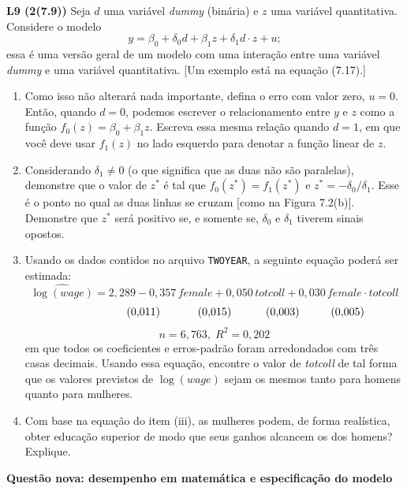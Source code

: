 \documentclass[12pt,letterpaper,onecolumn]{exam}
\begin{document}
\begin{questions}
\question \textbf{L9 (2(7.9))} Seja \(d\) uma variável \textit{dummy} (binária) e \(z\) uma variável quantitativa. Considere o modelo
\[
y = \beta_0 + \delta_0 d + \beta_1 z + \delta_1 d \cdot z + u;
\]
essa é uma versão geral de um modelo com uma interação entre uma variável \textit{dummy} e uma variável quantitativa. [Um exemplo está na equação (7.17).]
\begin{enumerate}[label=(\roman*)]
    \item Como isso não alterará nada importante, defina o erro com valor zero, \(u=0\). Então, quando \(d=0\), podemos escrever o relacionamento entre \(y\) e \(z\) como a função \(f_0(z)=\beta_0+\beta_1 z\). Escreva essa mesma relação quando \(d=1\), em que você deve usar \(f_1(z)\) no lado esquerdo para denotar a função linear de \(z\).
    \item Considerando \(\delta_1 \neq 0\) (o que significa que as duas não são paralelas), demonstre que o valor de \(z^\ast\) é tal que \(f_0(z^\ast)=f_1(z^\ast)\) e \(z^\ast = -\delta_0/\delta_1\). Esse é o ponto no qual as duas linhas se cruzam [como na Figura 7.2(b)]. Demonstre que \(z^\ast\) será positivo se, e somente se, \(\delta_0\) e \(\delta_1\) tiverem sinais opostos.
    \item Usando os dados contidos no arquivo \texttt{TWOYEAR}, a seguinte equação poderá ser estimada:
    \[
    \widehat{\log(wage)} = 2{,}289 - 0{,}357\,female + 0{,}050\,totcoll + 0{,}030\,female \cdot totcoll
    \]
    \[
    \hspace{2.0cm} (0{,}011)\hspace{1.2cm}(0{,}015)\hspace{1.1cm}(0{,}003)\hspace{1.0cm}(0{,}005)
    \]
    \[
    n = 6{,}763,\; R^2 = 0{,}202
    \]
    em que todos os coeficientes e erros-padrão foram arredondados com três casas decimais. Usando essa equação, encontre o valor de \textit{totcoll} de tal forma que os valores previstos de \(\log(wage)\) sejam os mesmos tanto para homens quanto para mulheres.
    \item Com base na equação do item (iii), as mulheres podem, de forma realística, obter educação superior de modo que seus ganhos alcancem os dos homens? Explique.
\end{enumerate}

\vspace{0.7cm}

\question \textbf{Questão nova: desempenho em matemática e especificação do modelo}


\end{questions}
\end{document}
